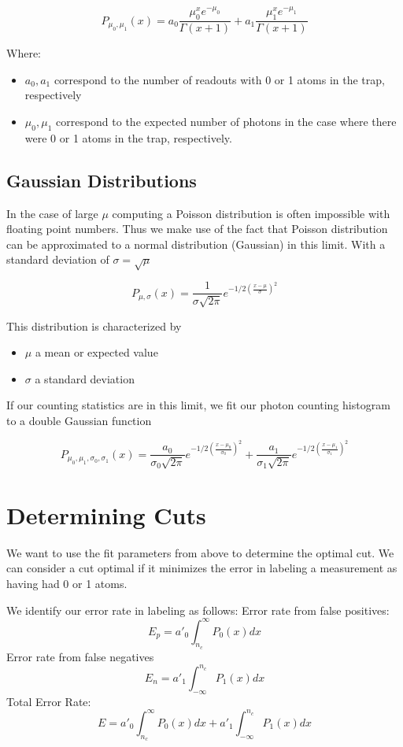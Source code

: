 \documentclass{article}
\begin{document}
\[P_{\mu_0,\mu_1}(x) = a_0\frac{\mu_0^x e^{-\mu_0}}{\Gamma(x+1)}+a_1\frac{\mu_1^x e^{-\mu_1}}{\Gamma(x+1)}\]

Where:
\begin{itemize}
    \item $a_0, a_1$ correspond to the number of readouts with 0 or 1 atoms in the trap, respectively
    \item $\mu_0, \mu_1$ correspond to the expected number of photons in the case where there were 0 or 1 atoms in the trap, respectively.
\end{itemize}


\subsection{Gaussian Distributions}
In the case of large $\mu$ computing a Poisson distribution is often impossible with floating point numbers. Thus we make use of the fact that Poisson distribution can be approximated to a normal distribution (Gaussian) in this limit. With a standard deviation of $\sigma = \sqrt{\mu}$

\[P_{\mu,\sigma}(x) = \frac{1}{\sigma\sqrt{2\pi}}e^{-1/2\left(\frac{x-\mu}{\sigma}\right)^2}\]

This distribution is characterized by
\begin{itemize}
    \item $\mu$ a mean or expected value
    \item $\sigma$ a standard deviation
\end{itemize}

If our counting statistics are in this limit, we fit our photon counting histogram to a double Gaussian function

\[P_{\mu_0,\mu_1,\sigma_0,\sigma_1}(x) = \frac{a_0}{\sigma_0\sqrt{2\pi}}e^{-1/2\left(\frac{x-\mu_0}{\sigma_0}\right)^2}+\frac{a_1}{\sigma_1\sqrt{2\pi}}e^{-1/2\left(\frac{x-\mu_1}{\sigma_1}\right)^2}\]

\section{Determining Cuts}

We want to use the fit parameters from above to determine the optimal cut. We can consider a cut optimal if it minimizes the error in labeling a measurement as having had 0 or 1 atoms.

We identify our error rate in labeling as follows:
Error rate from false positives:
\[ E_p = a'_0\int_{n_c}^\infty P_0(x)dx\]
Error rate from false negatives
\[ E_n = a'_1\int_{-\infty}^{n_c} P_1(x)dx\]
Total Error Rate:
\[ E = a'_0\int_{n_c}^\infty P_0(x)dx + a'_1\int_{-\infty}^{n_c} P_1(x)dx\]
\end{document}
